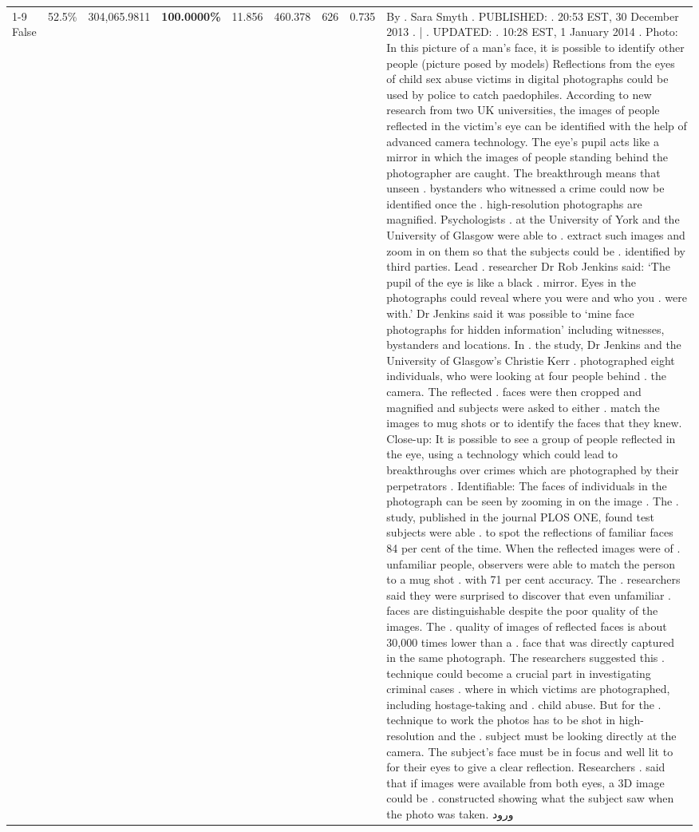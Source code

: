 \begin{table}[H]
\begin{tabular}{lllrlllll}
\cline{1-9}
False & 52.5\% & 304,065.9811 & \bfseries \color{red} 100.0000\% & 11.856 & 460.378 & 626 & 0.735 & By . Sara Smyth . PUBLISHED: . 20:53 EST, 30 December 2013 . | . UPDATED: . 10:28 EST, 1 January 2014 . Photo: In this picture of a man's face, it is possible to identify other people (picture posed by models) Reflections from the eyes of child sex abuse victims in digital photographs could be used by police to catch paedophiles. According to new research from two UK universities, the images of people reflected in the victim's eye can be identified with the help of advanced camera technology. The eye's pupil acts like a mirror in which the images of people standing behind the photographer are caught. The breakthrough means that unseen . bystanders who witnessed a crime could now be identified once the . high-resolution photographs are magnified. Psychologists . at the University of York and the University of Glasgow were able to . extract such images and zoom in on them so that the subjects could be . identified by third parties. Lead . researcher Dr Rob Jenkins said: ‘The pupil of the eye is like a black . mirror. Eyes in the photographs could reveal where you were and who you . were with.' Dr Jenkins said it was possible to ‘mine face photographs for hidden information' including witnesses, bystanders and locations. In . the study, Dr Jenkins and the University of Glasgow's Christie Kerr . photographed eight individuals, who were looking at four people behind . the camera. The reflected . faces were then cropped and magnified and subjects were asked to either . match the images to mug shots or to identify the faces that they knew. Close-up: It is possible to see a group of people reflected in the eye, using a technology which could lead to breakthroughs over crimes which are photographed by their perpetrators . Identifiable: The faces of individuals in the photograph can be seen by zooming in on the image . The . study, published in the journal PLOS ONE, found test subjects were able . to spot the reflections of familiar faces 84 per cent of the time. When the reflected images were of . unfamiliar people, observers were able to match the person to a mug shot . with 71 per cent accuracy. The . researchers said they were surprised to discover that even unfamiliar . faces are distinguishable despite the poor quality of the images. The . quality of images of reflected faces is about 30,000 times lower than a . face that was directly captured in the same photograph. The researchers suggested this . technique could become a crucial part in investigating criminal cases . where in which victims are photographed, including hostage-taking and . child abuse. But for the . technique to work the photos has to be shot in high-resolution and the . subject must be looking directly at the camera. The subject's face must be in focus and well lit to for their eyes to give a clear reflection. Researchers . said that if images were available from both eyes, a 3D image could be . constructed showing what the subject saw when the photo was taken. ورود \\

\end{tabular}
\end{table}
